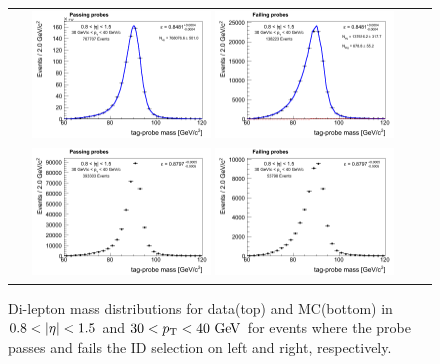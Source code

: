 %
\begin{figure}[htp] 
\centering 
\begin{tabular}{cc} 
\includegraphics[width=0.45\textwidth]{figures/passetapt_data_13.png} 
\includegraphics[width=0.45\textwidth]{figures/failetapt_data_13.png}  \\
\includegraphics[width=0.45\textwidth]{figures/passetapt_mc_13.png} 
\includegraphics[width=0.45\textwidth]{figures/failetapt_mc_13.png} 
\end{tabular} 
\caption{Di-lepton mass distributions for data(top) and MC(bottom) 
         in $0.8<|\Eta|<1.5$ and $30 < p_\mathrm{T} < 40~\mathrm{Ge\kern -0.1em V}$ for events 
         where the probe passes and fails the ID selection on left and right, 
         respectively. }
\label{fig:ideff_pt30to40_eta0p8to1p5} 
\end{figure} 



